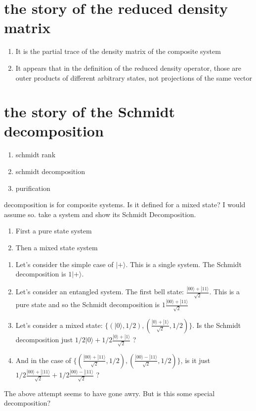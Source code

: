 \documentclass[a4paper,12pt]{amsbook}
\newcommand{\0}{{$|0\rangle$}}
\newcommand{\1}{{$|1\rangle$}}
\begin{document}
\section{the story of the reduced density matrix}
\begin{enumerate}
    \item It is the partial trace of the density matrix of the composite system
    \item It appears that in the definition of the reduced density operator, those are outer products of different arbitrary states, not projections of the same vector
\end{enumerate}
\section{the story of the Schmidt decomposition}
\begin{enumerate}
    \item schmidt rank
    \item schmidt decomposition
    \item purification
\end{enumerate}
decomposition is for composite systems. Is it defined for a mixed state? I would assume so. 
take a system and show its Schmidt Decomposition. 
    
\begin{enumerate}
    \item First a pure state system
    \item Then a mixed state system
\end{enumerate}

\begin{enumerate}
    \item Let's consider the simple case of $|+\rangle$. This is a single system. The Schmidt decomposition is $ 1 |+ \rangle$.
    \item Let's consider an entangled system. The first bell state: $\frac{ |00\rangle + |11\rangle }{ \sqrt2 } $. This is a pure state and so the Schmidt decomposition is $ 1 \frac{ |00\rangle + |11\rangle }{ \sqrt2 } $
    \item Let's consider a mixed state: $\{(|0\rangle, 1/2), (\frac{ |0\rangle + |1\rangle }{ \sqrt2 }, 1/2) \}$. Is the Schmidt decomposition just $ 1/2 |0\rangle + 1/2 \frac{ |0\rangle + |1\rangle }{ \sqrt2 } $ ?
    \item And in the case of $\{ {( \frac{ |00\rangle + |11\rangle }{ \sqrt2 }, 1/2), ( \frac{ |00\rangle - |11\rangle }{ \sqrt2 }, 1/2)} \}$, is it just $ 1/2  \frac{ |00\rangle + ||11\rangle }{ \sqrt2 }  + 1/2  \frac{ |00\rangle - ||11\rangle }{ \sqrt2 } $ ?
\end{enumerate}
The above attempt seems to have gone awry. But is this some special decomposition?
\end{document}
